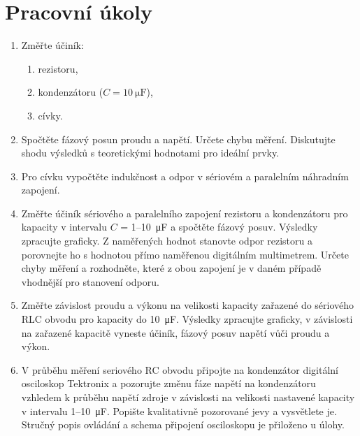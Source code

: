 \documentclass[a4paper]{article}
\author{Vladislav Wohlrath}
\begin{document}
\begin{titlepage}

\end{titlepage}

\section*{Pracovní úkoly}
\begin{enumerate}
\item Změřte účiník:
\begin{enumerate}
\item rezistoru,
\item kondenzátoru ($C=\SI{10}{\micro\farad}$),
\item cívky.
\end{enumerate}
\item Spočtěte fázový posun proudu a napětí. Určete chybu měření. Diskutujte shodu výsledků s teoretickými hodnotami pro ideální prvky.
\item Pro cívku vypočtěte indukčnost a odpor v sériovém a paralelním náhradním zapojení.
\item Změřte účiník sériového a paralelního zapojení rezistoru a kondenzátoru pro kapacity v intervalu $C$ =  \mbox{1--\SI{10}{\micro\farad}} a spočtěte fázový posuv. Výsledky zpracujte graficky. Z naměřených hodnot stanovte odpor rezistoru a porovnejte ho s hodnotou přímo naměřenou digitálním multimetrem. Určete chyby měření a rozhodněte, které z obou zapojení je v daném případě vhodnější pro stanovení odporu.
\item Změřte závislost proudu a výkonu na velikosti kapacity zařazené do sériového RLC obvodu pro kapacity do \SI{10}{\micro\farad}. Výsledky zpracujte graficky, v závislosti na zařazené kapacitě vyneste účiník, fázový posuv napětí vůči proudu a výkon.
\item V průběhu měření seriového RC obvodu připojte na kondenzátor digitální osciloskop Tektronix a pozorujte změnu fáze napětí na kondenzátoru vzhledem k průběhu napětí zdroje v závislosti na velikosti nastavené kapacity v intervalu 1--\SI{10}{\micro\farad}. Popište kvalitativně pozorované jevy a vysvětlete je. Stručný popis ovládání a schema připojení osciloskopu je přiloženo u úlohy.


\end{enumerate}










\printbibliography[title={Seznam použité literatury}]


\end{document}
